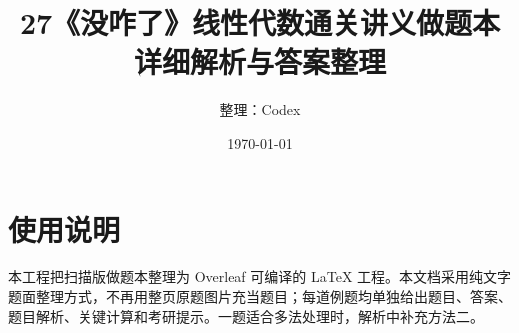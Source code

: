 \documentclass[UTF8,12pt,a4paper]{ctexbook}
\title{27《没咋了》线性代数通关讲义做题本\\详细解析与答案整理}
\author{整理：Codex}
\date{\today}
\begin{document}
\maketitle
\tableofcontents

\chapter*{使用说明}
本工程把扫描版做题本整理为 Overleaf 可编译的 LaTeX 工程。本文档采用纯文字题面整理方式，不再用整页原题图片充当题目；每道例题均单独给出题目、答案、题目解析、关键计算和考研提示。一题适合多法处理时，解析中补充方法二。







\end{document}
